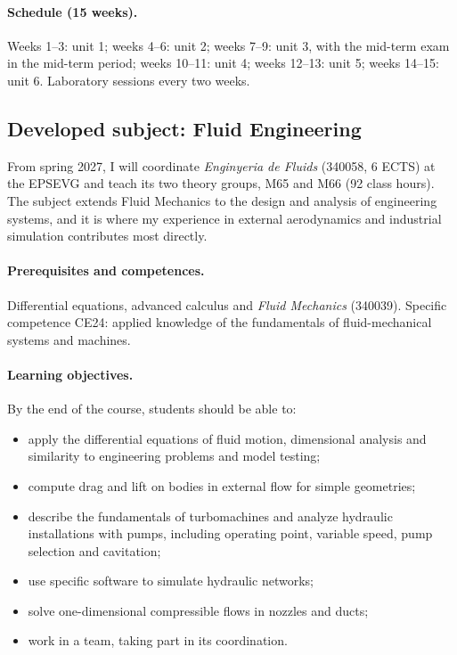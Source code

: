 \documentclass[11pt]{article}
\begin{document}
\paragraph{Schedule (15 weeks).} Weeks 1--3: unit 1; weeks 4--6: unit 2; weeks 7--9:
unit 3, with the mid-term exam in the mid-term period; weeks 10--11: unit 4; weeks
12--13: unit 5; weeks 14--15: unit 6. Laboratory sessions every two weeks.

\subsection{Developed subject: Fluid Engineering}\label{sec:ef}
From spring 2027, I will coordinate \emph{Enginyeria de Fluids} (340058, 6 ECTS) at the
EPSEVG and teach its two theory groups, M65 and M66 (92 class hours). The subject extends
Fluid Mechanics to the design and analysis of engineering systems, and it is where my
experience in external aerodynamics and industrial simulation contributes most directly.

\paragraph{Prerequisites and competences.} Differential equations, advanced calculus and
\emph{Fluid Mechanics} (340039). Specific competence CE24: applied knowledge of the
fundamentals of fluid-mechanical systems and machines.

\paragraph{Learning objectives.} By the end of the course, students should be able to:
\begin{itemize}
  \item apply the differential equations of fluid motion, dimensional analysis and
  similarity to engineering problems and model testing;
  \item compute drag and lift on bodies in external flow for simple geometries;
  \item describe the fundamentals of turbomachines and analyze hydraulic installations
  with pumps, including operating point, variable speed, pump selection and cavitation;
  \item use specific software to simulate hydraulic networks;
  \item solve one-dimensional compressible flows in nozzles and ducts;
  \item work in a team, taking part in its coordination.
\end{itemize}
\end{document}
